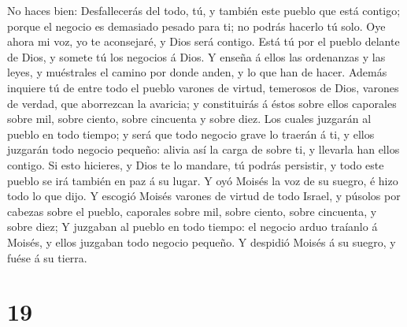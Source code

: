 No haces bien:  Desfallecerás del todo, tú, y también
este pueblo que está contigo; porque el negocio es demasiado pesado para
ti; no podrás hacerlo tú solo.  Oye ahora mi voz, yo te
aconsejaré, y Dios será contigo. Está tú por el pueblo delante de Dios,
y somete tú los negocios á Dios.  Y enseña á ellos las
ordenanzas y las leyes, y muéstrales el camino por donde anden, y lo que
han de hacer.  Además inquiere tú de entre todo el pueblo
varones de virtud, temerosos de Dios, varones de verdad, que aborrezcan
la avaricia; y constituirás á éstos sobre ellos caporales sobre mil,
sobre ciento, sobre cincuenta y sobre diez.  Los cuales
juzgarán al pueblo en todo tiempo; y será que todo negocio grave lo
traerán á ti, y ellos juzgarán todo negocio pequeño: alivia así la carga
de sobre ti, y llevarla han ellos contigo.  Si esto
hicieres, y Dios te lo mandare, tú podrás persistir, y todo este pueblo
se irá también en paz á su lugar.  Y oyó Moisés la voz de
su suegro, é hizo todo lo que dijo.  Y escogió Moisés
varones de virtud de todo Israel, y púsolos por cabezas sobre el pueblo,
caporales sobre mil, sobre ciento, sobre cincuenta, y sobre diez;
 Y juzgaban al pueblo en todo tiempo: el negocio arduo
traíanlo á Moisés, y ellos juzgaban todo negocio pequeño.
 Y despidió Moisés á su suegro, y fuése á su tierra.

\hypertarget{section-18}{%
\section{19}\label{section-18}}

